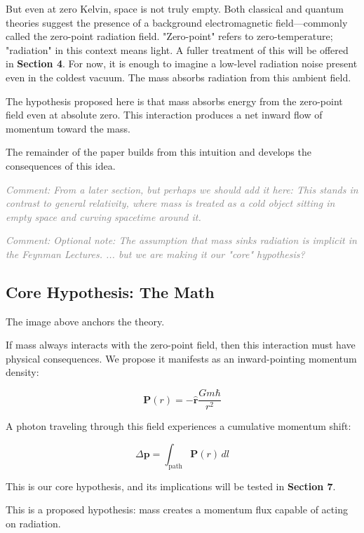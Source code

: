 \documentclass {article}
\renewcommand\vec{\mathbf}
\let\OldHat\hat
\renewcommand{\hat}[1]{\OldHat{\mathbf{#1}}}
\newcommand{\comment}[1]{\textcolor{gray}{\small\textit{Comment: #1}}}
\begin{document}
But even at zero Kelvin, space is not truly empty. Both classical and quantum theories suggest the presence of a background electromagnetic field—commonly called the zero-point radiation field. "Zero-point" refers to zero-temperature; "radiation" in this context means light. A fuller treatment of this will be offered in \textbf{Section 4}. For now, it is enough to imagine a low-level radiation noise present even in the coldest vacuum. The mass absorbs radiation from this ambient field.

The hypothesis proposed here is that mass absorbs energy from the zero-point field even at absolute zero. This interaction produces a net inward flow of momentum toward the mass.

The remainder of the paper builds from this intuition and develops the consequences of this idea.

 \comment{From a later section, but perhaps we should add it here: This stands in contrast to general relativity, where mass is treated as a cold object sitting in empty space and curving spacetime around it.}

\comment{Optional note: The assumption that mass sinks radiation is implicit in the Feynman Lectures. ... but we are making it our "core" hypothesis?}

\subsection{Core Hypothesis: The Math}

The image above anchors the theory.

If mass always interacts with the zero-point field, then this interaction must have physical consequences. We propose it manifests as an inward-pointing momentum density:

\begin{equation}
\boxed{\vec{P}(r) = -\hat{r} \frac{G m \hbar}{r^2}}
\label{eq:hypothesis}
\end{equation}


A photon traveling through this field experiences a cumulative momentum shift:

\begin{equation}
\Delta \vec{p} = \int_{\text{path}} \vec{P}(r) \, dl
\label{eq:hypothesis2}
\end{equation}

This is our core hypothesis, and its implications will be tested in \textbf{Section 7}.

This is a proposed hypothesis: mass creates a momentum flux capable of acting on radiation. 
\end{document}
